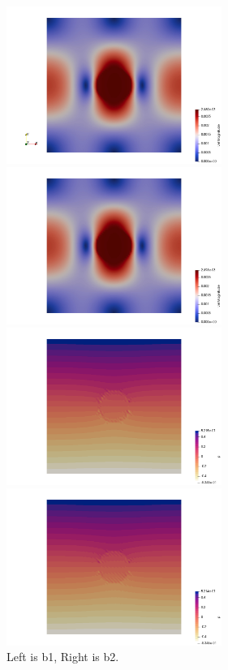\begin{center}
\includegraphics[width=7cm]{python_codes/fieldstone_72/results/sphere/vel_b1}
\includegraphics[width=7cm]{python_codes/fieldstone_72/results/sphere/vel_b2}\\
\includegraphics[width=7cm]{python_codes/fieldstone_72/results/sphere/p_b1}
\includegraphics[width=7cm]{python_codes/fieldstone_72/results/sphere/p_b2}\\
{\captionfont Left is b1, Right is b2.}
\end{center}

